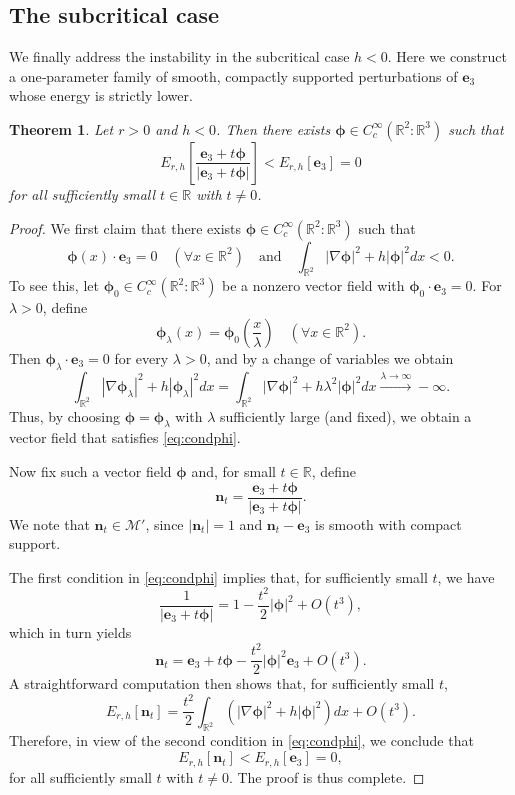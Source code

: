\documentclass{amsart}
\numberwithin{equation}{section}
\newtheorem{theorem}{Theorem}[section]
\theoremstyle{definition}
\theoremstyle{remark}
\newcommand{\R}{\mathbb{R}}
\newcommand{\boM}{\mathcal{M}}
\newcommand{\la}{\ensuremath{\lambda}}
\newcommand{\nab}{{\nabla}}							%
\newcommand{\bn}{{\mathbf{n}}}
\newcommand{\boe}{{\mathbf{e}}}
\newcommand{\bphi}{{\bm{\phi}}}
\begin{document}
\subsection{The subcritical case}

We finally address the instability in the subcritical case $h<0$. Here we construct a one‑parameter family of smooth, compactly supported perturbations of $\boe_3$ whose energy is strictly lower.


\begin{theorem}\label{thm:h<0}
Let $r>0$ and $h<0$. Then there exists $\bphi\in C_c^\infty(\R^2:\R^3)$ such that
$$
E_{r,h}\left[\frac{\boe_3+t\bphi}{|\boe_3+t\bphi|}\right] < E_{r,h}[\boe_3] = 0
$$
for all sufficiently small $t\in\R$ with $t\neq0$.
\end{theorem}

%
%
\begin{proof}
We first claim that there exists $\bphi\in C_c^\infty(\R^2:\R^3)$ such that
\begin{equation}\label{eq:condphi}
\bphi(x)\cdot \boe_3=0\quad (\forall x\in\R^2) \quad\mathrm{and}\quad \int_{\R^2} |\nab \bphi|^2 + h |\bphi|^2 dx <0.
\end{equation}
To see this, let $\bphi_0\in C_c^\infty(\R^2:\R^3)$ be a nonzero vector field with $\bphi_0\cdot \boe_3=0$. For $\la>0$, define
$$
\bphi_\la(x)= \bphi_0 \left(\frac{x}{\la}\right) \quad (\forall x\in\R^2).
$$
Then $\bphi_\la\cdot \boe_3=0$ for every $\la>0$, and by a change of variables we obtain
$$
\int_{\R^2} |\nab \bphi_\la|^2 + h |\bphi_\la|^2 dx = \int_{\R^2} |\nab \bphi|^2 + h\la^2 |\bphi|^2 dx \xrightarrow{\la\to\infty} -\infty.
$$
Thus, by choosing $\bphi=\bphi_\la$ with $\la$ sufficiently large (and fixed), we obtain a vector field that satisfies \eqref{eq:condphi}.

Now fix such a vector field $\bphi$ and, for small $t\in\R$, define
$$
\bn_t = \frac{\boe_3+t\bphi}{|\boe_3+t\bphi|}.
$$
We note that $\bn_t\in \boM'$, since $|\bn_t|=1$ and $\bn_t-\boe_3$ is smooth with compact support.

The first condition in \eqref{eq:condphi} implies that, for sufficiently small $t$, we have
$$
\frac{1}{|\boe_3 + t\bphi|}=1-\frac{t^2}{2}|\bphi|^2+O(t^3),
$$
which in turn yields
$$
\bn_t = \boe_3+ t \bphi -\frac{t^2}{2}|\bphi|^2 \boe_3+ O(t^3).
$$
A straightforward computation then shows that, for sufficiently small $t$,
$$
E_{r,h}[\bn_t]=\frac{t^2}{2}\int_{\R^2}\left(|\nabla \bphi|^2 +h|\bphi|^2\right)dx+O(t^3).
$$
Therefore, in view of the second condition in \eqref{eq:condphi}, we conclude that
$$
E_{r,h}[\bn_t]<E_{r,h}[\boe_3]=0,
$$
for all sufficiently small $t$ with $t\neq 0$. The proof is thus complete.
\end{proof}
\end{document}

